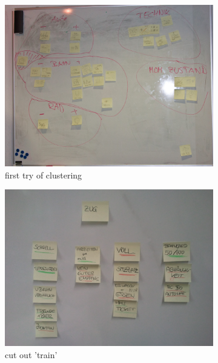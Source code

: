 \begin{figure}[!h]
	\begin{subfigure}[b]{0.29\textwidth}
		\centering
		\includegraphics[width=\textwidth]{images/mindmap1.jpg}
		\caption{first try of clustering}
		\label{fig:mindmap1}
	\end{subfigure}
	\begin{subfigure}[b]{0.3\textwidth}
		\centering
		\includegraphics[width=\textwidth]{images/mindmap2.jpg}
		\caption{ cut out 'train'}
		\label{fig:mindmap2}
	\end{subfigure}
	\begin{subfigure}[b]{0.3\textwidth}
		\centering

\end{subfigure}
\end{figure}
